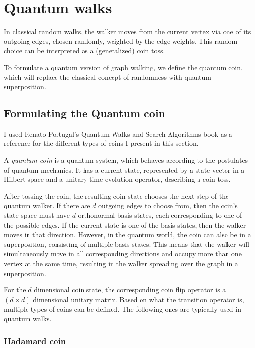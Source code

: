 \chapter{Quantum walks}

In classical random walks, the walker moves from the current vertex via one of its outgoing edges, chosen randomly, weighted by the edge weights. This random choice can be interpreted as a (generalized) coin toss.

To formulate a quantum version of graph walking, we define the quantum coin, which will replace the classical concept of randomness with quantum superposition.

\section{Formulating the Quantum coin}

I used Renato Portugal's Quantum Walks and Search Algorithms\cite{Portugal} book as a reference for the different types of coins I present in this section.

A \textit{quantum coin} is a quantum system, which behaves according to the postulates of quantum mechanics. It has a current state, represented by a state vector in a Hilbert space and a unitary time evolution operator, describing a coin toss.

After tossing the coin, the resulting coin state chooses the next step of the quantum walker. If there are $d$ outgoing edges to choose from, then the coin's state space must have $d$ orthonormal basis states, each corresponding to one of the possible edges. If the current state is one of the basis states, then the walker moves in that direction. However, in the quantum world, the coin can also be in a superposition, consisting of multiple basis states. This means that the walker will simultaneously move in all corresponding directions and occupy more than one vertex at the same time, resulting in the walker spreading over the graph in a superposition.

For the $d$ dimensional coin state, the corresponding coin flip operator is a $(d\times{}d)$ dimensional unitary matrix. Based on what the transition operator is, multiple types of coins can be defined. The following ones are typically used in quantum walks.

\subsection{Hadamard coin}


